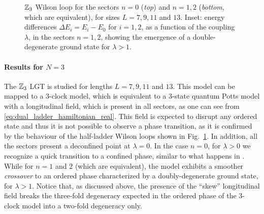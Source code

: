 \begin{figure}[t]
    \centering
    
    \vspace*{-10pt}
    \caption{$\mathbb{Z}_3$ Wilson loop for the sectors $n=0$ (\emph{top}) and $n=1,2$ (\emph{bottom}, which are equivalent), for sizes $L = 7,9,11$ and $13$.
       Inset: energy differences $\Delta E_i = E_i - E_0$ for $i=1,2$, as a function of the coupling $\lambda$, in the sectors $n=1,2$, showing the emergence of a double-degenerate ground state for $\lambda > 1$.
}
    \label{fig:z3_wilson}
\end{figure}


\smallskip

\paragraph{Results for \texorpdfstring{$N=3$}{N=3}}%
The $\mathbb{Z}_3$ LGT is studied for lengths $L=7,9,11$ and $13$.
This model can be mapped to a $3$-clock model, which is equivalent to a $3$-state quantum Potts model with a longitudinal field, which is present in all sectors, as one can see from \eqref{eq:dual_ladder_hamiltonian_real}.
This field is expected to disrupt any ordered state and thus it is not possible to observe a phase transition, as it is confirmed  by the behaviour of the half-ladder Wilson loops  shown in Fig.~\ref{fig:z3_wilson}.
In addition, all the sectors present a deconfined point at $\lambda = 0$.
In the case $n=0$, for $\lambda > 0$ we recognize a quick transition to a confined phase, similar to what happens in \cite{burrello2021ladder}.
While for $n=1$ and $2$ (which are equivalent), the model exhibits a smoother \emph{crossover} to an ordered phase characterized by a doubly-degenerate ground state, for $\lambda > 1$.
Notice that, as discussed above,  the presence of the ``skew'' longitudinal field breaks the three-fold degeneracy expected in the ordered phase of the $3$-clock model into a two-fold degeneracy only.

\smallskip

